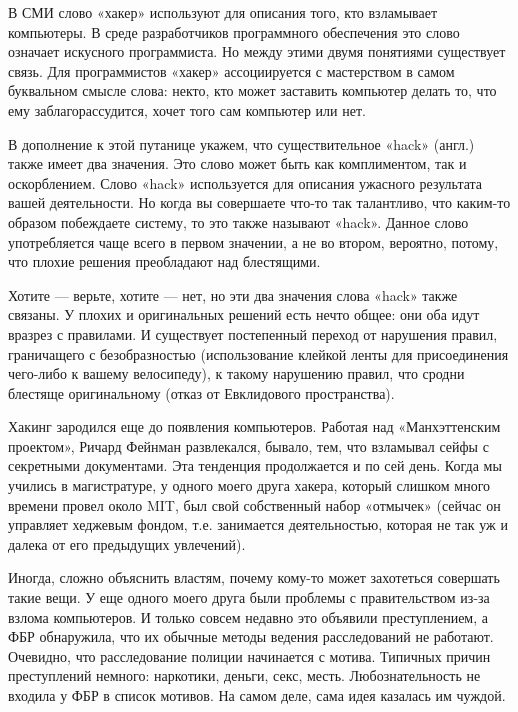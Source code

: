 \documentclass[ebook,12pt,oneside,openany]{memoir}
\begin{document}
\maketitle

В СМИ слово «хакер» используют для описания того, кто взламывает
компьютеры. В среде разработчиков программного обеспечения это слово
означает искусного программиста. Но между этими двумя понятиями
существует связь. Для программистов «хакер» ассоциируется с
мастерством в самом буквальном смысле слова: некто, кто может
заставить компьютер делать то, что ему заблагорассудится, хочет того
сам компьютер или нет.

В дополнение к этой путанице укажем, что существительное «hack»
(англ.) также имеет два значения. Это слово может быть как
комплиментом, так и оскорблением. Слово «hack» используется для
описания ужасного результата вашей деятельности. Но когда вы
совершаете что-то так талантливо, что каким-то образом побеждаете
систему, то это также называют «hack». Данное слово употребляется чаще
всего в первом значении, а не во втором, вероятно, потому, что плохие
решения преобладают над блестящими.

Хотите — верьте, хотите — нет, но эти два значения слова «hack» также
связаны. У плохих и оригинальных решений есть нечто общее: они оба
идут вразрез с правилами. И существует постепенный переход от
нарушения правил, граничащего с безобразностью (использование клейкой
ленты для присоединения чего-либо к вашему велосипеду), к такому
нарушению правил, что сродни блестяще оригинальному (отказ от
Евклидового пространства).



Хакинг зародился еще до появления компьютеров. Работая над
«Манхэттенским проектом», Ричард Фейнман развлекался, бывало, тем, что
взламывал сейфы с секретными документами. Эта тенденция продолжается и
по сей день. Когда мы учились в магистратуре, у одного моего друга
хакера, который слишком много времени провел около MIT, был свой
собственный набор «отмычек» (сейчас он управляет хеджевым фондом, т.е.
занимается деятельностью, которая не так уж и далека от его предыдущих
увлечений).

Иногда, сложно объяснить властям, почему кому-то может захотеться
совершать такие вещи. У еще одного моего друга были проблемы с
правительством из-за взлома компьютеров. И только совсем недавно это
объявили преступлением, а ФБР обнаружила, что их обычные методы
ведения расследований не работают. Очевидно, что расследование полиции
начинается с мотива. Типичных причин преступлений немного: наркотики,
деньги, секс, месть. Любознательность не входила у ФБР в список
мотивов. На самом деле, сама идея казалась им чуждой.
\end{document}
